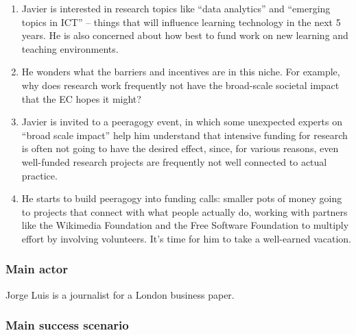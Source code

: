 \begin{enumerate}
\item
  Javier is interested in research topics like ``data analytics'' and
  ``emerging topics in ICT'' -- things that will influence learning
  technology in the next 5 years. He is also concerned about how best to
  fund work on new learning and teaching environments.
\item
  He wonders what the barriers and incentives are in this niche. For
  example, why does research work frequently not have the broad-scale
  societal impact that the EC hopes it might?
\item
  Javier is invited to a peeragogy event, in which some unexpected
  experts on ``broad scale impact'' help him understand that intensive
  funding for research is often not going to have the desired effect,
  since, for various reasons, even well-funded research projects are
  frequently not well connected to actual practice.
\item
  He starts to build peeragogy into funding calls: smaller pots of money
  going to projects that connect with what people actually do, working
  with partners like the Wikimedia Foundation and the Free Software
  Foundation to multiply effort by involving volunteers. It's time for
  him to take a well-earned vacation.
\end{enumerate}
\subsubsection{Main actor}

Jorge Luis is a journalist for a London business paper.

\subsubsection{Main success scenario}

